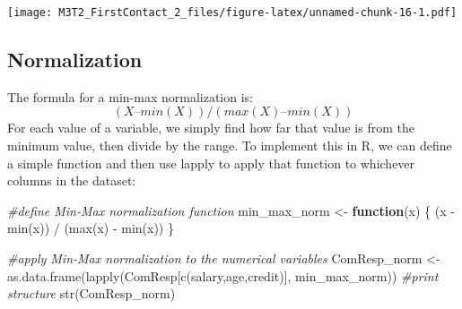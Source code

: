 \documentclass[
]{article}
\newenvironment{Shaded}{\begin{snugshade}}{\end{snugshade}}
\newcommand{\AttributeTok}[1]{\textcolor[rgb]{0.77,0.63,0.00}{#1}}
\newcommand{\CommentTok}[1]{\textcolor[rgb]{0.56,0.35,0.01}{\textit{#1}}}
\newcommand{\ControlFlowTok}[1]{\textcolor[rgb]{0.13,0.29,0.53}{\textbf{#1}}}
\newcommand{\DecValTok}[1]{\textcolor[rgb]{0.00,0.00,0.81}{#1}}
\newcommand{\FunctionTok}[1]{\textcolor[rgb]{0.00,0.00,0.00}{#1}}
\newcommand{\NormalTok}[1]{#1}
\newcommand{\OtherTok}[1]{\textcolor[rgb]{0.56,0.35,0.01}{#1}}
\newcommand{\SpecialCharTok}[1]{\textcolor[rgb]{0.00,0.00,0.00}{#1}}
\newcommand{\StringTok}[1]{\textcolor[rgb]{0.31,0.60,0.02}{#1}}
\begin{document}
\begin{Shaded}
\end{Shaded}

\texttt{[image: M3T2\_FirstContact\_2\_files/figure-latex/unnamed-chunk-16-1.pdf]}

\hypertarget{normalization}{%
\subsection{Normalization}\label{normalization}}

The formula for a min-max normalization is:
\[(X – min(X))/(max(X) – min(X))\] For each value of a variable, we
simply find how far that value is from the minimum value, then divide by
the range. To implement this in R, we can define a simple function and
then use lapply to apply that function to whichever columns in the
dataset:

\begin{Shaded}
\begin{Highlighting}[]
\CommentTok{\#define Min{-}Max normalization function}
\NormalTok{min\_max\_norm }\OtherTok{\textless{}{-}} \ControlFlowTok{function}\NormalTok{(x) \{ }
\NormalTok{  (x }\SpecialCharTok{{-}} \FunctionTok{min}\NormalTok{(x)) }\SpecialCharTok{/}\NormalTok{ (}\FunctionTok{max}\NormalTok{(x) }\SpecialCharTok{{-}} \FunctionTok{min}\NormalTok{(x))}
\NormalTok{  \}}
\end{Highlighting}
\end{Shaded}

\begin{Shaded}
\begin{Highlighting}[]
\CommentTok{\#apply Min{-}Max normalization to the numerical variables}
\NormalTok{ComResp\_norm }\OtherTok{\textless{}{-}} \FunctionTok{as.data.frame}\NormalTok{(}\FunctionTok{lapply}\NormalTok{(ComResp[}\FunctionTok{c}\NormalTok{(}\StringTok{\textquotesingle{}salary\textquotesingle{}}\NormalTok{,}\StringTok{\textquotesingle{}age\textquotesingle{}}\NormalTok{,}\StringTok{\textquotesingle{}credit\textquotesingle{}}\NormalTok{)], min\_max\_norm))}
\CommentTok{\#print structure}
\FunctionTok{str}\NormalTok{(ComResp\_norm)}
\end{Highlighting}
\end{Shaded}
\end{document}
